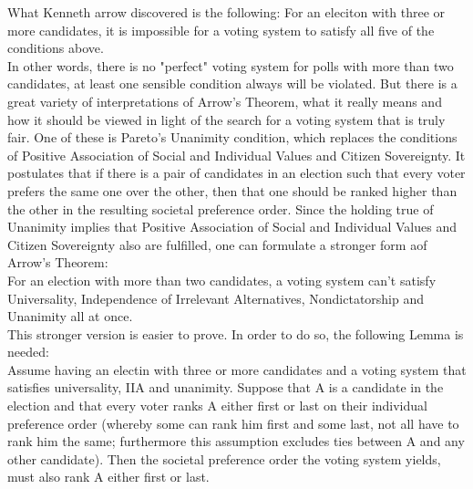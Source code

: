 What Kenneth arrow discovered is the following: For an eleciton with three or more candidates, it is impossible for a voting system to satisfy all five of the conditions above. \\
In other words, there is no "perfect" voting system for polls with more than two candidates, at least one sensible condition always will be violated. But there is a great variety of interpretations of Arrow's Theorem, what it really means and how it should be viewed in light of the search for a voting system that is truly fair. 
One of these is Pareto's Unanimity condition, which replaces the conditions of Positive Association of Social and Individual Values and Citizen Sovereignty. It postulates that if there is a pair of candidates in an election such that every voter prefers the same one over the other, then that one should be ranked higher than the other in the resulting societal preference order. 
Since the holding true of Unanimity implies that Positive Association of Social and Individual Values and Citizen Sovereignty also are fulfilled, one can formulate a stronger form aof Arrow's Theorem: \\
For an election with more than two candidates, a voting system can't satisfy Universality, Independence of Irrelevant Alternatives, Nondictatorship and Unanimity all at once. \\

This stronger version is easier to prove. In order to do so, the following Lemma is needed: \\

Assume having an electin with three or more candidates and a voting system that satisfies universality, IIA and unanimity. Suppose that A is a candidate in the election and that every voter ranks A either first or last on their individual preference order (whereby some can rank him first and some last, not all have to rank him the same; furthermore this assumption excludes ties between A and any other candidate). Then the societal preference order the voting system yields, must also rank A either first or last. \\

